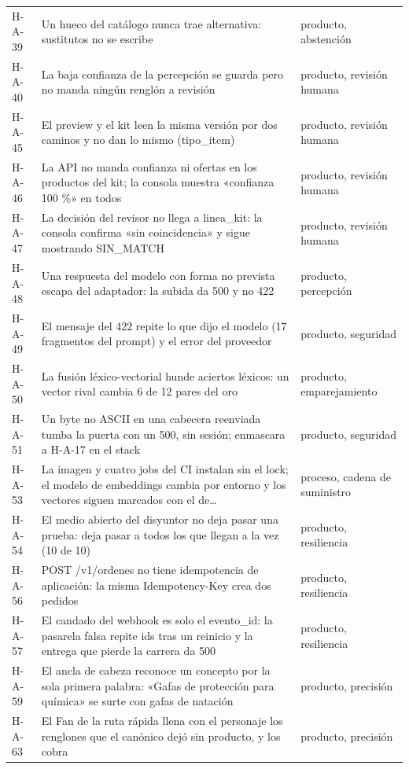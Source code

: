 \begin{longtable}{@{}p{1.3cm}p{10.6cm}p{2.6cm}@{}}
H-A-39 & Un hueco del catálogo nunca trae alternativa: sustitutos no se escribe & producto, abstención \\
H-A-40 & La baja confianza de la percepción se guarda pero no manda ningún renglón a revisión & producto, revisión humana \\
H-A-45 & El preview y el kit leen la misma versión por dos caminos y no dan lo mismo (tipo\_item) & producto, revisión humana \\
H-A-46 & La API no manda confianza ni ofertas en los productos del kit; la consola muestra «confianza 100 \%» en todos & producto, revisión humana \\
H-A-47 & La decisión del revisor no llega a linea\_kit: la consola confirma «sin coincidencia» y sigue mostrando SIN\_MATCH & producto, revisión humana \\
H-A-48 & Una respuesta del modelo con forma no prevista escapa del adaptador: la subida da 500 y no 422 & producto, percepción \\
H-A-49 & El mensaje del 422 repite lo que dijo el modelo (17 fragmentos del prompt) y el error del proveedor & producto, seguridad \\
H-A-50 & La fusión léxico-vectorial hunde aciertos léxicos: un vector rival cambia 6 de 12 pares del oro & producto, emparejamiento \\
H-A-51 & Un byte no ASCII en una cabecera reenviada tumba la puerta con un 500, sin sesión; enmascara a H-A-17 en el stack & producto, seguridad \\
H-A-53 & La imagen y cuatro jobs del CI instalan sin el lock; el modelo de embeddings cambia por entorno y los vectores siguen marcados con el de\ldots & proceso, cadena de suministro \\
H-A-54 & El medio abierto del disyuntor no deja pasar una prueba: deja pasar a todos los que llegan a la vez (10 de 10) & producto, resiliencia \\
H-A-56 & POST /v1/ordenes no tiene idempotencia de aplicación: la misma Idempotency-Key crea dos pedidos & producto, resiliencia \\
H-A-57 & El candado del webhook es solo el evento\_id: la pasarela falsa repite ids tras un reinicio y la entrega que pierde la carrera da 500 & producto, resiliencia \\
H-A-59 & El ancla de cabeza reconoce un concepto por la sola primera palabra: «Gafas de protección para química» se surte con gafas de natación & producto, precisión \\
H-A-63 & El Fan de la ruta rápida llena con el personaje los renglones que el canónico dejó sin producto, y los cobra & producto, precisión \\

\end{longtable}
